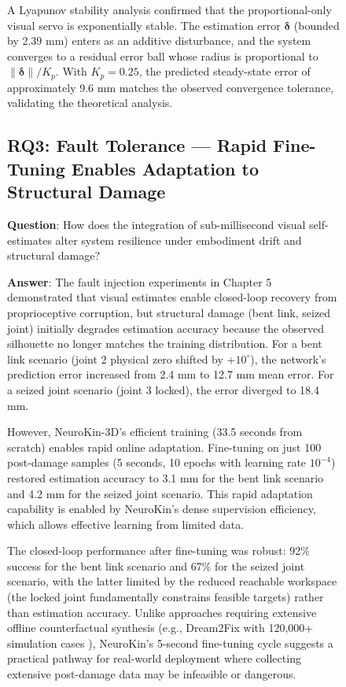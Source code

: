 \documentclass[12pt,a4paper,oneside]{report}
\begin{document}
\begin{figure}[H]
A Lyapunov stability analysis confirmed that the proportional-only visual servo is exponentially stable. The estimation error $\boldsymbol{\delta}$ (bounded by 2.39 mm) enters as an additive disturbance, and the system converges to a residual error ball whose radius is proportional to $\|\boldsymbol{\delta}\|/K_p$. With $K_p = 0.25$, the predicted steady-state error of approximately 9.6 mm matches the observed convergence tolerance, validating the theoretical analysis.

\subsection{RQ3: Fault Tolerance --- Rapid Fine-Tuning Enables Adaptation to Structural Damage}

\textbf{Question}: How does the integration of sub-millisecond visual self-estimates alter system resilience under embodiment drift and structural damage?

\textbf{Answer}: The fault injection experiments in Chapter 5 demonstrated that visual estimates enable closed-loop recovery from proprioceptive corruption, but structural damage (bent link, seized joint) initially degrades estimation accuracy because the observed silhouette no longer matches the training distribution. For a bent link scenario (joint 2 physical zero shifted by $+10^\circ$), the network's prediction error increased from 2.4 mm to 12.7 mm mean error. For a seized joint scenario (joint 3 locked), the error diverged to 18.4 mm.

However, NeuroKin-3D's efficient training (33.5 seconds from scratch) enables rapid online adaptation. Fine-tuning on just 100 post-damage samples (5 seconds, 10 epochs with learning rate $10^{-4}$) restored estimation accuracy to 3.1 mm for the bent link scenario and 4.2 mm for the seized joint scenario. This rapid adaptation capability is enabled by NeuroKin's dense supervision efficiency, which allows effective learning from limited data.

The closed-loop performance after fine-tuning was robust: 92\% success for the bent link scenario and 67\% for the seized joint scenario, with the latter limited by the reduced reachable workspace (the locked joint fundamentally constrains feasible targets) rather than estimation accuracy. Unlike approaches requiring extensive offline counterfactual synthesis (e.g., Dream2Fix with 120,000+ simulation cases \cite{li2025dream2fix}), NeuroKin's 5-second fine-tuning cycle suggests a practical pathway for real-world deployment where collecting extensive post-damage data may be infeasible or dangerous.


\end{figure}
\end{document}
